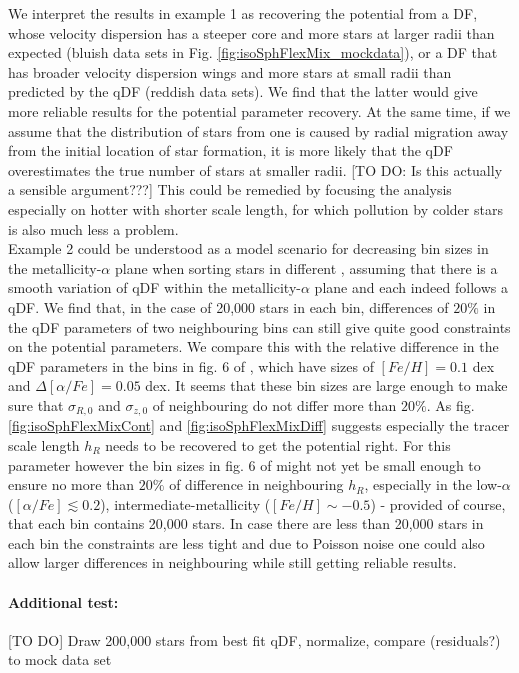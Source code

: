 We interpret the results in example 1 as recovering the potential from a DF, whose velocity dispersion has a steeper core and more stars at larger radii than expected (bluish data sets in Fig. \ref{fig:isoSphFlexMix_mockdata}), or a DF that has broader velocity dispersion wings and more stars at small radii than predicted by the qDF (reddish data sets). We find that the latter would give more reliable results for the potential parameter recovery. At the same time, if we assume that the distribution of stars from one \MAP is caused by radial migration away from the initial location of star formation, it is more likely that the qDF overestimates the true number of stars at smaller radii. [TO DO: Is this actually a sensible argument???] This could be remedied by focusing the analysis especially on hotter \MAPs with shorter scale length, for which pollution by colder stars is also much less a problem.
\\Example 2 could be understood as a model scenario for decreasing bin sizes in the metallicity-$\alpha$ plane when sorting stars in different \MAPs, assuming that there is a smooth variation of qDF within the metallicity-$\alpha$ plane and each \MAP indeed follows a qDF. We find that, in the case of 20,000 stars in each bin, differences of $20\%$ in the qDF parameters of two neighbouring bins can still give quite good constraints on the potential parameters. We compare this with the relative difference in the qDF parameters in the bins in fig. 6 of \cite{bov13}, which have sizes of $[Fe/H] = 0.1$ dex and $\Delta [\alpha/Fe] = 0.05$ dex. It seems that these bin sizes are large enough to make sure that $\sigma_{R,0}$ and $\sigma_{z,0}$ of neighbouring \MAPs do not differ more than $20\%$. As fig. \ref{fig:isoSphFlexMixCont} and \ref{fig:isoSphFlexMixDiff} suggests especially the tracer scale length $h_R$ needs to be recovered to get the potential right. For this parameter however the bin sizes in fig. 6 of \cite{bov13} might not yet be small enough to ensure no more than $20\%$ of difference in neighbouring $h_R$, especially in the low-$\alpha$ ($[\alpha/Fe] \lesssim 0.2$), intermediate-metallicity ($[Fe/H] \sim -0.5$) \MAPs - provided of course, that each bin contains 20,000 stars. In case there are less than 20,000 stars in each bin the constraints are less tight and due to Poisson noise one could also allow larger differences in neighbouring \MAPs while still getting reliable results.


\paragraph{Additional test:} [TO DO] Draw 200,000 stars from best fit qDF, normalize, compare (residuals?) to mock data set

